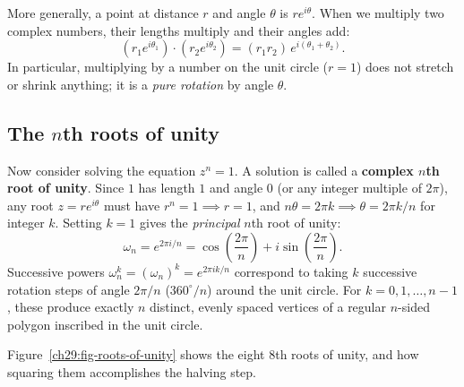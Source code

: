 More generally, a point at distance $r$ and angle $\theta$ is $r e^{i\theta}$. When we multiply two complex numbers, their lengths multiply and their angles add:
\[
(r_1 e^{i\theta_1}) \cdot (r_2 e^{i\theta_2}) = (r_1 r_2) \, e^{i(\theta_1 + \theta_2)} .
\]
In particular, multiplying by a number on the unit circle ($r = 1$) does not
stretch or shrink anything; it is a \emph{pure rotation} by angle $\theta$.

\subsection{The $n$th roots of unity}

Now consider solving the equation $z^n = 1$. A solution is called a
\textbf{complex $n$th root of unity}. Since $1$ has length $1$ and angle
$0$ (or any integer multiple of $2\pi$), any root $z = r e^{i\theta}$ must have
$r^n = 1 \implies r = 1$, and $n\theta = 2\pi k \implies \theta = 2\pi k / n$
for integer $k$. Setting $k = 1$ gives the \emph{principal} $n$th root of unity:
\[
\omega_n = e^{2\pi i/n} = \cos\left(\frac{2\pi}{n}\right) + i\sin\left(\frac{2\pi}{n}\right) .
\]
Successive powers $\omega_n^k = (\omega_n)^k = e^{2\pi i k / n}$ correspond to
taking $k$ successive rotation steps of angle $2\pi/n$ ($360^\circ / n$) around
the unit circle. For $k = 0, 1, \dots, n-1$, these produce exactly $n$ distinct,
evenly spaced vertices of a regular $n$-sided polygon inscribed in the unit
circle.

Figure~\ref{ch29:fig-roots-of-unity} shows the eight $8$th roots of unity, and
how squaring them accomplishes the halving step.

